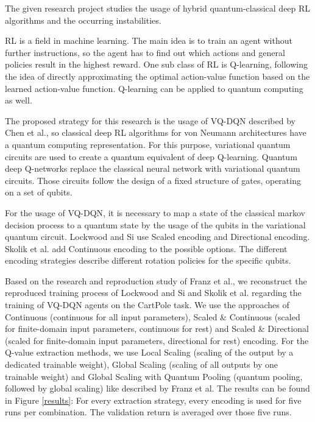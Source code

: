 The given research project studies the usage of hybrid quantum-classical deep \ac{RL} algorithms and the occurring instabilities.

\ac{RL} is a field in machine learning.
The main idea is to train an agent without further instructions, so the agent has to find out which actions and general policies result in the highest reward.
One sub class of \ac{RL} is Q-learning, following the idea of directly approximating the optimal action-value function based on the learned action-value function.\autocite{rl} 
Q-learning can be applied to quantum computing as well.


The proposed strategy for this research is the usage of \ac{VQ-DQN} described by Chen et al., so classical deep \ac{RL} algorithms for von Neumann architectures have a quantum computing representation.\autocite{vqdqn}
For this purpose, variational quantum circuits are used to create a quantum equivalent of deep Q-learning.
Quantum deep Q-networks replace the classical neural network with variational quantum circuits.
Those circuits follow the design of a fixed structure of gates, operating on a set of qubits.\autocite{circuits}


For the usage of \ac{VQ-DQN}, it is necessary to map a state of the classical markov decision process to a quantum state by the usage of the qubits in the variational quantum circuit. 
Lockwood and Si use Scaled encoding and Directional encoding.\autocite{lockwood}
Skolik et al. add Continuous encoding to the possible options.\autocite{skolik} 
The different encoding strategies describe different rotation policies for the specific qubits.


Based on the research and reproduction study of Franz et al., we reconstruct the reproduced training process of Lockwood and Si and Skolik et al. regarding the training of \ac{VQ-DQN} agents on the CartPole task. 
We use the approaches of Continuous (continuous for all input parameters), Scaled \& Continuous (scaled for finite-domain input parameters, continuous for rest) and Scaled \& Directional (scaled for finite-domain input parameters, directional for rest) encoding. 
For the Q-value extraction methods, we use Local Scaling (scaling of the output by a dedicated trainable weight), Global Scaling (scaling of all outputs by one trainable weight) and Global Scaling with Quantum Pooling (quantum pooling, followed by global scaling) like described by Franz et al.
The results can be found in Figure \ref{results}: For every extraction strategy, every encoding is used for five runs per combination.
The validation return is averaged over those five runs.

